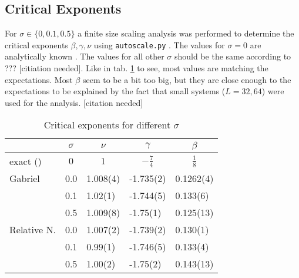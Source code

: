 \subsection{Critical Exponents}
    For \(\sigma \in \{0,0.1,0.5\}\) a finite size scaling analysis was
    performed to determine the critical exponents \(\beta, \gamma, \nu\)
    using \texttt{autoscale.py} \cite{autoscale2009}. The values for
    \(\sigma = 0\) are analytically known \cite{Pelissetto2002}. The
    values for all other \(\sigma\) should be the same according to ???
    [citiation needed]. Like in tab. \ref{tab:critExp} to see, most values
    are matching the expectations. Most \(\beta\) seem to be a bit too
    big, but they are close enough to the expectations to be explained
    by the fact that small systems (\(L=32,64\)) were used for the
    analysis. [citation needed]
    \begin{table}[htbp]
        \center
        \begin{tabular}{l l l l l}
            \toprule
             & \multicolumn{1}{c}{\(\sigma\)} & \multicolumn{1}{c}{\(\nu\)} & \multicolumn{1}{c}{\(\gamma\)} & \multicolumn{1}{c}{\(\beta\)}\\
            \midrule
            exact (\cite[p. 59]{Pelissetto2002}) & \multicolumn{1}{c}{\(0\)} & \multicolumn{1}{c}{\(1\)} & \multicolumn{1}{c}{\(-\frac{7}{4}\)} & \multicolumn{1}{c}{\(\frac{1}{8}\)}\\
            \midrule
            Gabriel      & 0.0 & 1.008(4) & -1.735(2) & 0.1262(4)\\
                         & 0.1 & 1.02(1)  & -1.744(5) & 0.133(6) \\
                         & 0.5 & 1.009(8) & -1.75(1)  & 0.125(13)\\
            \midrule
            Relative N.  & 0.0 & 1.007(2) & -1.739(2) & 0.130(1) \\
                         & 0.1 & 0.99(1)  & -1.746(5) & 0.133(4) \\
                         & 0.5 & 1.00(2)  & -1.75(2)  & 0.143(13)\\
            \bottomrule
        \end{tabular}
        \caption{Critical exponents for different \(\sigma\)}
        \label{tab:critExp}
    \end{table}


